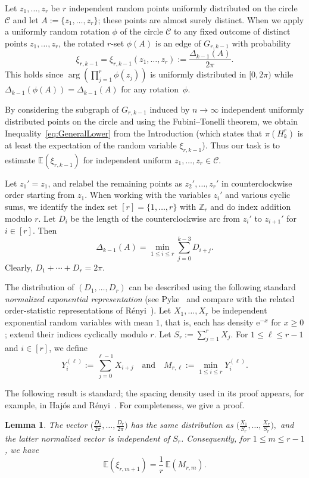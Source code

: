 \documentclass[10pt,a4paper]{article}
\numberwithin{equation}{section}
\newtheorem{lemma}[theorem]{Lemma}
\theoremstyle{definition}
\theoremstyle{remark}
\newcommand{\Z}[1]{\mathbb Z_{#1}}
\newcommand{\me}{\mathrm{e}}
\begin{document}
Let $z_1,\dots,z_r$ be $r$ independent random points uniformly distributed on the circle~$\mathcal C$ and let $A:=\{z_1,\dots,z_r\}$; these points are almost surely distinct. When we apply a uniformly random rotation $\phi$ of the circle $\mathcal C$ to any fixed outcome of distinct points $z_1,\dots,z_r$, the rotated $r$-set $\phi(A)$ is an edge of $G_{r,k-1}$ with probability 
\[
\xi_{r,k-1}=\xi_{r,k-1}(z_1,\dots,z_r):=\frac{\Delta_{k-1}(A)}{2\pi}.
\]
This holds since $\arg(\prod_{j=1}^r \phi(z_j))$ is uniformly distributed in $[0,2\pi)$ while $\Delta_{k-1}(\phi(A))=\Delta_{k-1}(A)$ for any rotation~$\phi$. 

By considering the subgraph of $G_{r,k-1}$ induced by $n\to\infty$ independent uniformly distributed points on the circle and using the Fubini--Tonelli theorem, we obtain Inequality~\eqref{eq:GeneralLower} from the Introduction (which states that $\pi(H_k^r)$ is at least the expectation of the random variable $\xi_{r,k-1}$).
Thus our task is to estimate $\mathbb E(\xi_{r,k-1})$ for independent uniform $z_1,\dots,z_r\in\mathcal C$.

Let $z_1'=z_1$, and relabel the remaining points as $z_2',\dots,z_r'$ in counterclockwise order starting from $z_1$. When working with the variables $z_i'$ and various cyclic sums, we identify the index set $[r]=\{1,\dots,r\}$ with $\Z{r}$ and do index addition modulo $r$. 
Let $D_i$ be the length of the counterclockwise arc from $z_i'$ to $z_{i+1}'$ for $i\in [r]$. Then
\[\Delta_{k-1}(A)=\min_{1\le i\le r} \sum_{j=0}^{k-3}D_{i+j}.\]
Clearly, $D_1+\cdots +D_r=2\pi$.

The distribution of $(D_1,\dots,D_r)$ can be described using the following standard \emph{normalized exponential representation} (see Pyke~\cite[Section~4.1]{Pyke65} and compare with the related order-statistic representations of R\'enyi~\cite{Renyi53}).
Let $X_1,\ldots,X_r$ be independent exponential random variables with mean $1$, that is, each has density $\me^{-x}$ for $x\ge0$; extend their indices cyclically modulo $r$.  
Let $S_r:=\sum_{j=1}^rX_j$.
For $1\le\ell\le r-1$ and $i\in [r]$, we define
$$Y_i^{(\ell)}:=\sum_{j=0}^{\ell-1}X_{i+j}
\quad \text{and} \quad
M_{r,\ell}:=\min_{1\le i\le r}Y_i^{(\ell)}.$$

The following result is standard; the spacing density used in its proof appears, for example, in Haj{\'o}s and R{\'e}nyi~\cite[Eq.~(6)]{HajosRenyi54}. For completeness, we give a proof.


\begin{lemma}\label{lem:renyi1953}
The vector $\big(\frac{D_1}{2\pi },\ldots, \frac{D_r}{2\pi }\big)$ has the same distribution as
$\big(\frac{X_1}{S_r},\ldots,\frac{X_r}{S_r}\big),$
and the latter normalized vector is independent of $S_r$.  Consequently, for $1\le m\le r-1$, we have
\begin{equation}\label{eq:EXi}
        \mathbb{E}(\xi_{r,m+1})=\frac1r\,\mathbb{E}(M_{r,m}).
\end{equation}
\end{lemma}
\end{document}
